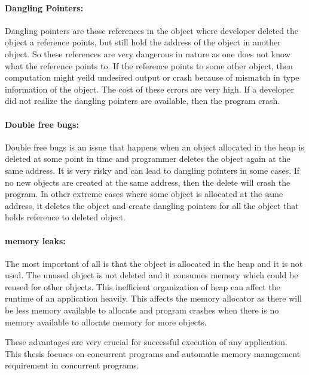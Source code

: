 \paragraph{Dangling Pointers:}
	Dangling pointers are those references in
	the object where developer deleted the object a reference points, but still hold the address of the object in another object. So these references are very dangerous in nature as one does not know what the reference points to. If the reference points to some other object, then computation might yeild undesired output or crash because of mismatch in type information of the object. The cost of these errors are very high. If a developer did not realize the dangling pointers are available, then the program crash.
\paragraph{Double free bugs:}
	Double free bugs is an issue that happens when an object allocated in the heap is deleted at some point in time and programmer deletes the object again at the same address. It is very risky and can lead to dangling pointers in some cases. If no new objects are created at the same address, then the delete will crash the program. In other extreme cases where some object is allocated at the same address, it deletes the object and create dangling pointers for all the object that holds reference to deleted object. 
\paragraph{memory leaks:}
	The most important of all is that the object is allocated in the heap and it is not used. The unused object is not deleted and it consumes memory which could be reused for other objects. This inefficient organization of heap can affect the runtime of an application heavily. This affects the memory allocator as there will be less memory available to allocate and program crashes when there is no memory available to allocate memory for more objects.
	
These advantages are very crucial for successful execution of any application. This thesis focuses on concurrent programs and automatic memory management requirement in concurrent programs. 

